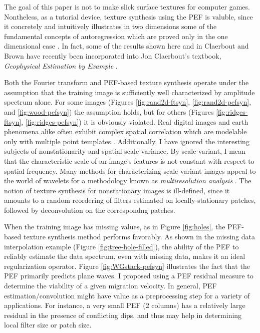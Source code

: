 	The goal of this paper is not to make slick surface textures for computer games.
	Nontheless, as a tutorial device, texture synthesis using the PEF is valuble, since
	it concretely and intuitively illustrates in two dimensions some of the fundamental 
	concepts of autoregression which are proved only in the one dimensional case 
	{\small \cite[]{fgdp}}.  In fact, some of the results shown here and in Claerbout and Brown 
	{\small {}} have recently been incorporated into Jon Claerbout's 
	textbook, {\em Geophysical Estimation by Example} {\small {}}.  

	\par
	Both the Fourier transform and PEF-based texture synthesis operate under the assumption
	that the training image is sufficiently well characterized by amplitude spectrum alone.
	For some images (Figures \ref{fig:rand2d-ftsyn}, \ref{fig:rand2d-pefsyn}, and 
	\ref{fig:wood-pefsyn}) the assumption holds, but for others (Figures \ref{fig:ridges-ftsyn},
	\ref{fig:ridges-pefsyn}) it is obviously violated.  Real digital images and earth
	phenomena alike often exhibit complex spatial correlation which are modelable only with
	multiple point templates  {\small \cite[]{caers-journel, malzbender-spach}}.  Additionally, 
	I have ignored the 
	interesting subjects of nonstationarity and spatial scale variance.  By scale-variant,
	I mean that the characteristic scale of an image's features is not constant with
	respect to spatial frequency.  Many methods for characterizing scale-variant images 
	appeal 
	to the world of wavelets for a methodology known as {\em multiresolution analysis}
	{\small \cite[]{simoncelli, heeger, strang}}.  The notion of texture synthesis for nonstationary
	images is ill-defined, since it amounts to a random reordering of filters estimated on
	locally-stationary patches, followed by deconvolution on the correspondng patches.

	\par
	When the training image has missing values, as in Figure \ref{fig:holes}, the PEF-based
	texture synthesis method performs favorably.  As shown in the missing data interpolation
	example (Figure \ref{fig:tree-hole-filled}), the ability of the PEF to reliably estimate
	the data spectrum, even with missing data, makes it an ideal regularization operator.
	Figure \ref{fig:WGstack-pefsyn} illustrates the fact that the PEF primarily predicts plane
	waves.  I proposed using a PEF residual measure to determine the viability of a given
	migration velocity.  In general, PEF estimation/convolution might have value as a 
	preprocessing step for a variety of applications.  For instance, a very small PEF
	(2 columns) has a relatively large residual in the presence of conflicting dips, and 
	thus may help in determining local filter size or patch size. 

